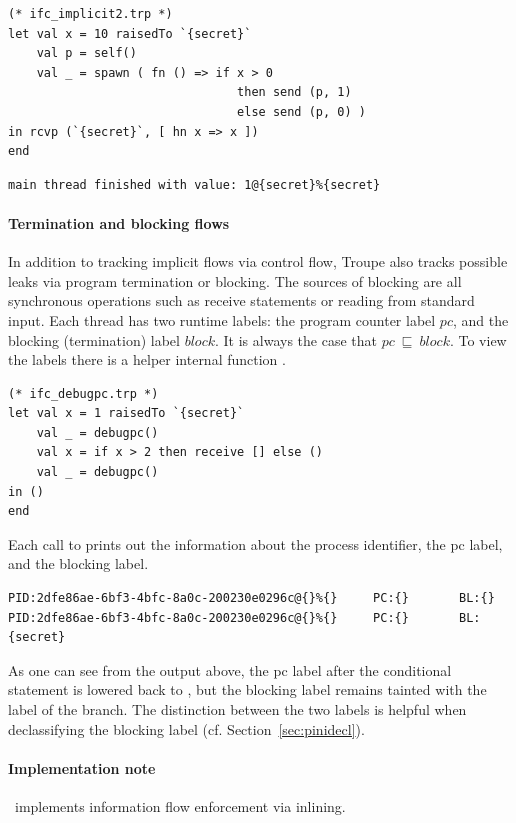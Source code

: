 \begin{lstlisting}
(* ifc_implicit2.trp *)
let val x = 10 raisedTo `{secret}`
    val p = self()
    val _ = spawn ( fn () => if x > 0 
    							then send (p, 1) 
    							else send (p, 0) )
in rcvp (`{secret}`, [ hn x => x ])
end
\end{lstlisting}
\begin{verbatim}
main thread finished with value: 1@{secret}%{secret}
\end{verbatim}


\paragraph{Termination and blocking flows} 
In addition to tracking implicit flows via control flow, Troupe also 
tracks possible leaks via program termination or blocking.
The sources of blocking are all synchronous operations such as receive statements or reading from standard input. 
Each thread has two runtime labels: the program counter label $\mathit{pc}$, and 
the blocking (termination) label $\mathit{block}$. It is always the case that 
$\mathit{pc}~\sqsubseteq~\mathit{block}$. To view the labels there is a 
helper internal function .
\begin{lstlisting}
(* ifc_debugpc.trp *)
let val x = 1 raisedTo `{secret}`
    val _ = debugpc() 
    val x = if x > 2 then receive [] else () 
    val _ = debugpc() 
in () 
end    
\end{lstlisting}

Each call to  prints out the information about the process identifier,
the pc label, and the blocking label.
\begin{verbatim}
PID:2dfe86ae-6bf3-4bfc-8a0c-200230e0296c@{}%{}     PC:{}       BL:{}                
PID:2dfe86ae-6bf3-4bfc-8a0c-200230e0296c@{}%{}     PC:{}       BL:{secret}           
\end{verbatim}
As one can see from the output above, the pc label after the conditional
statement is lowered back to \lev{}, but the blocking label remains tainted 
with the label of the branch. The distinction between the two labels
is helpful when declassifying the blocking label (cf. Section~\ref{sec:pinidecl}).



\paragraph{Implementation note}
\troupelang\ implements information flow enforcement via inlining.



